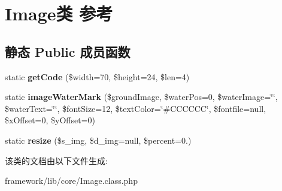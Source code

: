 \hypertarget{classImage}{\section{Image类 参考}
\label{classImage}
}
\subsection*{静态 Public 成员函数}
\begin{DoxyCompactItemize}
\item 
\hypertarget{classImage_ad665b63aa87b072bd796b20c30b0152e}{static {\bfseries get\+Code} (\$width=70, \$height=24, \$len=4)}\label{classImage_ad665b63aa87b072bd796b20c30b0152e}

\item 
\hypertarget{classImage_a87a55fa2f4340ef86598776b4f13dc32}{static {\bfseries image\+Water\+Mark} (\$ground\+Image, \$water\+Pos=0, \$water\+Image=\char`\"{}\char`\"{}, \$water\+Text=\char`\"{}\char`\"{}, \$font\+Size=12, \$text\+Color=\char`\"{}\#C\+C\+C\+C\+C\+C\char`\"{}, \$fontfile=null, \$x\+Offset=0, \$y\+Offset=0)}\label{classImage_a87a55fa2f4340ef86598776b4f13dc32}

\item 
\hypertarget{classImage_ac38d5aea25594c346fe9b2b853e7b39e}{static {\bfseries resize} (\$s\+\_\+img, \$d\+\_\+img=null, \$percent=0.)}\label{classImage_ac38d5aea25594c346fe9b2b853e7b39e}

\end{DoxyCompactItemize}


该类的文档由以下文件生成\+:\begin{DoxyCompactItemize}
\item 
framework/lib/core/Image.\+class.\+php\end{DoxyCompactItemize}
